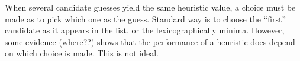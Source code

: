 When several candidate guesses yield the same heuristic value, a choice must be made as to pick which one as the guess. Standard way is to choose the ``first'' candidate as it appears in the list, or the lexicographically minima. However, some evidence (where??) shows that the performance of a heuristic does depend on which choice is made. This is not ideal.


























